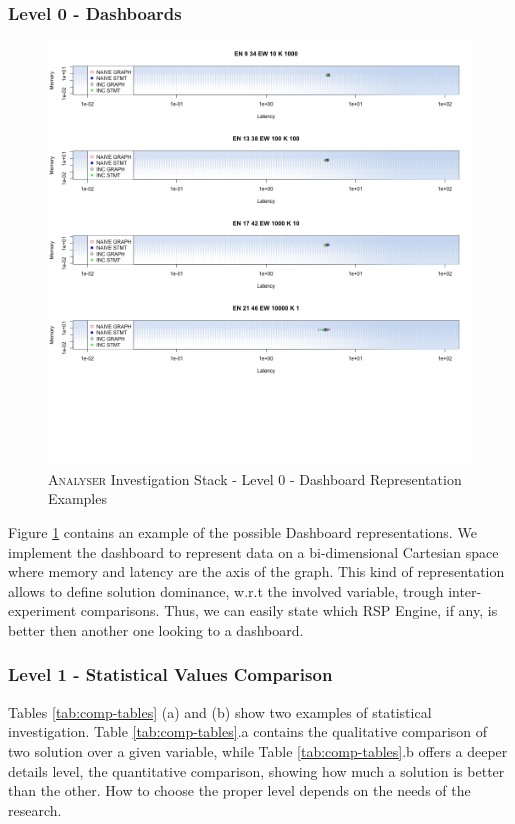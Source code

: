 \subsubsection{Level 0 - Dashboards}\label{sec:impl-level0}

\begin{figure}[h!tbp]
  \centering
	\includegraphics[width=0.45\linewidth]{images/dashboard-example}
	\caption[\textsc{Analyser} Investigation Stack - Level 0 -  Dashboard Representation Examples]{\textsc{Analyser} Investigation Stack - Level 0 -  Dashboard Representation Examples}
  	\label{fig:dashboard-example}
\end{figure}

\noindent Figure \ref{fig:dashboard-example} contains an example of the possible Dashboard representations. We implement the dashboard to represent data on a bi-dimensional Cartesian space where memory and latency are the axis of the graph. This kind of representation allows to define solution dominance, w.r.t the involved variable, trough inter-experiment comparisons. Thus, we can easily state which RSP Engine, if any, is better then another one looking to a dashboard.

\subsubsection{Level 1 - Statistical Values Comparison}\label{sec:impl-level1}

Tables \ref{tab:comp-tables} (a) and (b) show two examples of statistical investigation. Table \ref{tab:comp-tables}.a contains the qualitative comparison of two solution over a given variable, while Table \ref{tab:comp-tables}.b offers a deeper details level, the quantitative comparison, showing how much a solution is better than the other. How to choose the proper level depends on the needs of the research.


